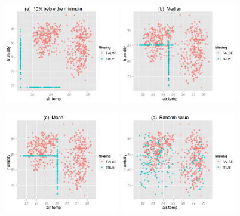 \documentclass[english]{article}
\begin{document}
\begin{center}
\begin{figure}[h]
\begin{centering}
\includegraphics[width=0.45\textwidth]{fig3-1} 
\includegraphics[width=0.45\textwidth]{fig3-2}
\par\end{centering}

\begin{centering}
\includegraphics[width=0.45\textwidth]{fig3-3} 
\includegraphics[width=0.45\textwidth]{fig3-4}
\par\end{centering}


\end{figure}
\end{center}
\end{document}
